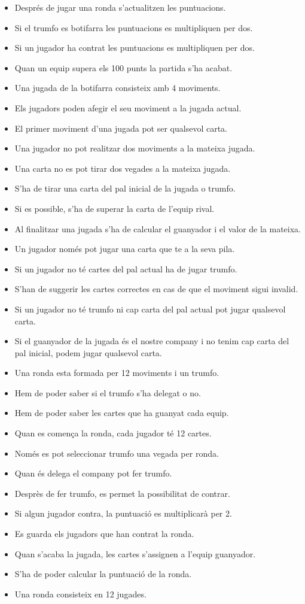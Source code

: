 \begin{itemize}
    \item{Després de jugar una ronda s'actualitzen les puntuacions.}
    \item{Si el trumfo es botifarra les puntuacions es multipliquen per dos.}
    \item{Si un jugador ha contrat les puntuacions es multipliquen per dos.}
    \item{Quan un equip supera els 100 punts la partida s'ha acabat.}
    \item{Una jugada de la botifarra consisteix amb 4 moviments.}
    \item{Els jugadors poden afegir el seu moviment a la jugada actual.}
    \item{El primer moviment d'una jugada pot ser qualsevol carta.}
    \item{Una jugador no pot realitzar dos moviments a la mateixa jugada.}
    \item{Una carta no es pot tirar dos vegades a la mateixa jugada.}
    \item{S'ha de tirar una carta del pal inicial de la jugada o trumfo.}
    \item{Si es possible, s'ha de superar la carta de l'equip rival.}
    \item{Al finalitzar una jugada s'ha de calcular el guanyador i el valor de la mateixa.}
    \item{Un jugador només pot jugar una carta que te a la seva pila.}
    \item{Si un jugador no té cartes del pal actual ha de jugar trumfo.}
    \item{S'han de suggerir les cartes correctes en cas de que el moviment sigui invalid.}
    \item{Si un jugador no té trumfo ni cap carta del pal actual pot jugar qualsevol carta.}
    \item{Si el guanyador de la jugada és el nostre company i no tenim cap carta del pal inicial, podem jugar qualsevol carta.}
    \item{Una ronda esta formada per 12 moviments i un trumfo.}
    \item{Hem de poder saber si el trumfo s'ha delegat o no.}
   \item{Hem de poder saber les cartes que ha guanyat cada equip.}
    \item{Quan es comença la ronda, cada jugador té 12 cartes.}
    \item{Només es pot seleccionar trumfo una vegada per ronda.}
    \item{Quan és delega el company pot fer trumfo.}
    \item{Desprès de fer trumfo, es permet la possibilitat de contrar.}
    \item{Si algun jugador contra, la puntuació es multiplicarà per 2.}
    \item{Es guarda els jugadors que han contrat la ronda.}
    \item{Quan s'acaba la jugada, les cartes s'assignen a l'equip guanyador.}
    \item{S'ha de poder calcular la puntuació de la ronda.}
    \item{Una ronda consisteix en 12 jugades.}
\end{itemize}  

